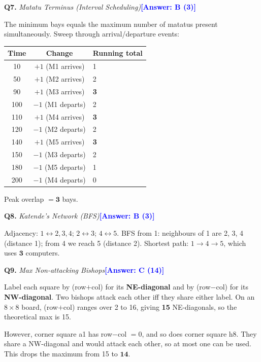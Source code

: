 \documentclass[a4paper,12pt]{article}
\newcommand{\ans}[1]{\textcolor{blue}{\textbf{[Answer: #1]}}}
\newcommand{\qsol}[3]{%
  \vspace{1.5ex}%
  \noindent\textbf{Q#1.} \textit{#2}\quad\ans{#3}%
  \par\vspace{0.4ex}%
}
\begin{document}
\qsol{7}{Matatu Terminus (Interval Scheduling)}{B (3)}

The minimum bays equals the maximum number of matatus present simultaneously.
Sweep through arrival/departure events:

\begin{center}
\begin{tabular}{ccl}
\toprule
Time & Change & Running total \\
\midrule
10  & $+1$ (M1 arrives) & 1 \\
50  & $+1$ (M2 arrives) & 2 \\
90  & $+1$ (M3 arrives) & \textbf{3} \\
100 & $-1$ (M1 departs) & 2 \\
110 & $+1$ (M4 arrives) & \textbf{3} \\
120 & $-1$ (M2 departs) & 2 \\
140 & $+1$ (M5 arrives) & \textbf{3} \\
150 & $-1$ (M3 departs) & 2 \\
180 & $-1$ (M5 departs) & 1 \\
200 & $-1$ (M4 departs) & 0 \\
\bottomrule
\end{tabular}
\end{center}

Peak overlap $= \mathbf{3}$ bays.

\qsol{8}{Katende's Network (BFS)}{B (3)}

Adjacency: $1\!\leftrightarrow\!2,3,4$; $2\!\leftrightarrow\!3$;
$4\!\leftrightarrow\!5$. BFS from 1: neighbours of 1 are 2, 3, 4 (distance 1);
from 4 we reach 5 (distance 2). Shortest path: $1\to 4\to 5$, which uses
$\mathbf{3}$ computers.

\qsol{9}{Max Non-attacking Bishops}{C (14)}

Label each square by (row$+$col) for its \textbf{NE-diagonal} and by
(row$-$col) for its \textbf{NW-diagonal}. Two bishops attack each other iff
they share either label. On an $8{\times}8$ board, (row$+$col) ranges over 2
to 16, giving \textbf{15} NE-diagonals, so the theoretical max is 15.

However, corner square a1 has row$-$col $= 0$, and so does corner square h8.
They share a NW-diagonal and would attack each other, so at most one can be
used. This drops the maximum from 15 to $\mathbf{14}$.
\end{document}
